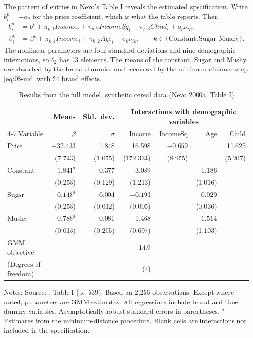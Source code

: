 The pattern of entries in Nevo's Table I reveals the estimated specification. Write $b_i^p=-\alpha_i$
for the price coefficient, which is what the table reports. Then
\begin{align*}
b_i^{p}&=b^{p}+\pi_{p,1}\mathit{Income}_i+\pi_{p,2}\mathit{IncomeSq}_i+\pi_{p,3}\mathit{Child}_i
 +\sigma_p\nu_{ip},\\
\beta_i^{k}&=\beta^{k}+\pi_{k,1}\mathit{Income}_i+\pi_{k,2}\mathit{Age}_i+\sigma_k\nu_{ik},
 \qquad k\in\{\text{Constant},\text{Sugar},\text{Mushy}\}.
\end{align*}
The nonlinear parameters are four standard deviations and nine demographic interactions, so $\theta_2$
has 13 elements. The means of the constant, Sugar and Mushy are absorbed by the brand dummies and
recovered by the minimum-distance step \eqref{eq:08-md} with 24 brand effects.

\begin{table}[htbp]
\centering
\caption{Results from the full model, synthetic cereal data (Nevo 2000a, Table I)}
\label{tab:08-nevo00-results}
\small
\begin{tabular}{@{}lrrrrrr@{}}
\toprule
 & Means & Std.\ dev. & \multicolumn{4}{c}{Interactions with demographic variables} \\
\cmidrule(l){4-7}
Variable & $\beta$ & $\sigma$ & Income & IncomeSq & Age & Child \\
\midrule
Price    & $-32.433$ & 1.848 & 16.598 & $-0.659$ & & 11.625 \\
         & (7.743) & (1.075) & (172.334) & (8.955) & & (5.207) \\
Constant & $-1.841^{a}$ & 0.377 & 3.089 & & 1.186 & \\
         & (0.258) & (0.129) & (1.213) & & (1.016) & \\
Sugar    & $0.148^{a}$ & 0.004 & $-0.193$ & & 0.029 & \\
         & (0.258) & (0.012) & (0.005) & & (0.036) & \\
Mushy    & $0.788^{a}$ & 0.081 & 1.468 & & $-1.514$ & \\
         & (0.013) & (0.205) & (0.697) & & (1.103) & \\
\midrule
GMM objective & & & 14.9 & & & \\
(Degrees of freedom) & & & (7) & & & \\
\bottomrule
\end{tabular}

\smallskip
\begin{minipage}{0.9\linewidth}
\footnotesize
Notes: Source: \citet{Nevo2000a}, Table I (p.~539). Based on 2,256 observations. Except where
noted, parameters are GMM estimates. All regressions include brand and time dummy variables.
Asymptotically robust standard errors in parentheses. $^{a}$Estimates from the minimum-distance
procedure. Blank cells are interactions not included in the specification.
\end{minipage}
\end{table}

